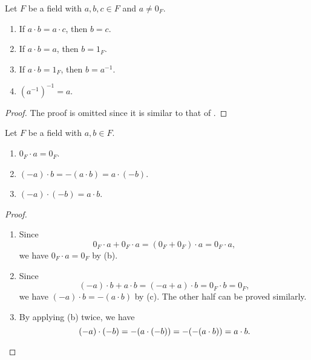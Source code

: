 \begin{proposition}\label{prop:field-multiplication}
  Let $F$ be a field with $a, b, c \in F$ and $a \neq 0_F$.
  \begin{enumerate}
    \item If $a \cdot b = a \cdot c$, then $b = c$.
    \item If $a \cdot b = a$, then $b = 1_F$.
    \item If $a \cdot b = 1_F$, then $b = a^{-1}$.
    \item $(a^{-1})^{-1} = a$.
  \end{enumerate}
\end{proposition}
\begin{proof}
  The proof is omitted since it is similar to that of
  .
\end{proof}

\begin{proposition}\label{prop:field-operation}
  Let $F$ be a field with $a, b \in F$.
  \begin{enumerate}
    \item $0_F \cdot a = 0_F$.
    \item $(-a) \cdot b = -(a \cdot b) = a \cdot (-b)$.
    \item $(-a) \cdot (-b) = a \cdot b$.
  \end{enumerate}
\end{proposition}
\begin{proof} \leavevmode
  \begin{enumerate}
    \item Since
      \begin{equation*}
        0_F \cdot a + 0_F \cdot a
        = (0_F + 0_F) \cdot a
        = 0_F \cdot a,
      \end{equation*}
      we have $0_F \cdot a = 0_F$ by  (b).
    \item Since
      \begin{equation*}
        (-a) \cdot b + a \cdot b
        = (-a + a) \cdot b
        = 0_F \cdot b
        = 0_F,
      \end{equation*}
      we have $(-a) \cdot b = -(a \cdot b)$ by  (c).
      The other half can be proved similarly.
    \item By applying (b) twice, we have
      \begin{equation*}
        (-a) \cdot (-b)
        = -(a \cdot (-b))
        = -(-(a \cdot b))
        = a \cdot b. \qedhere
      \end{equation*}
  \end{enumerate}
\end{proof}

